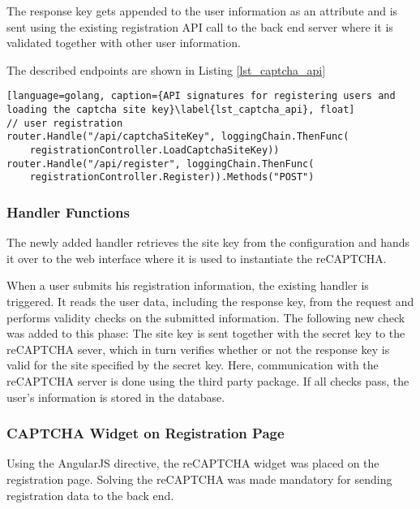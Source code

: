 The response key gets appended to the user information as an attribute and is sent using the existing registration API call to the back end server where it is validated together with other user information.

The described endpoints are shown in Listing \ref{lst_captcha_api}

\begin{lstlisting}[language=golang, caption={API signatures for registering users and loading the captcha site key}\label{lst_captcha_api}, float]
// user registration
router.Handle("/api/captchaSiteKey", loggingChain.ThenFunc(
	registrationController.LoadCaptchaSiteKey))
router.Handle("/api/register", loggingChain.ThenFunc(
	registrationController.Register)).Methods("POST")
\end{lstlisting}

\subsubsection{Handler Functions}

The newly added  handler retrieves the site key from the configuration and hands it over to the web interface where it is used to instantiate the reCAPTCHA.

When a user submits his registration information, the existing  handler is triggered. It reads the user data, including the response key, from the request and performs validity checks on the submitted information. The following new check was added to this phase:
The site key is sent together with the secret key to the reCAPTCHA sever, which in turn verifies whether or not the response key is valid for the site specified by the secret key. Here, communication with the reCAPTCHA server is done using the third party  package. If all checks pass, the user's information is stored in the database.

\subsubsection{CAPTCHA Widget on Registration Page}

Using the  AngularJS directive, the reCAPTCHA widget was placed on the registration page. Solving the reCAPTCHA was made mandatory for sending registration data to the back end.

